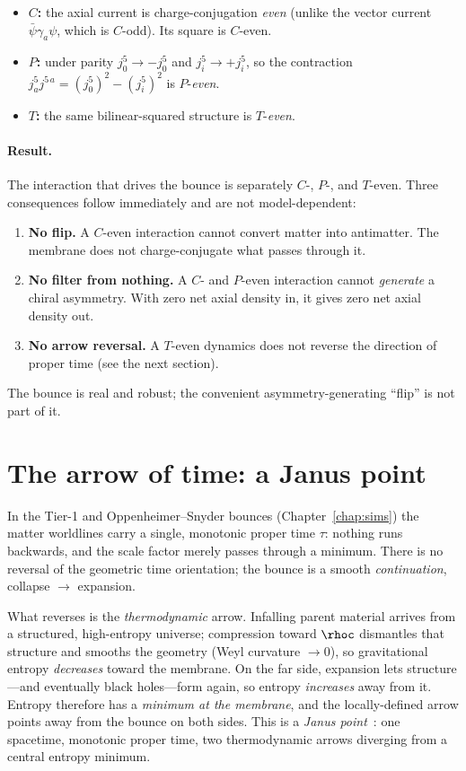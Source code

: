 \begin{itemize}
  \item \textbf{$C$:} the axial current is charge-conjugation \emph{even} (unlike
    the vector current $\bar\psi\gamma_a\psi$, which is $C$-odd). Its square is
    $C$-even.
  \item \textbf{$P$:} under parity $j^5_0 \to -j^5_0$ and $j^5_i \to +j^5_i$, so
    the contraction $j^5_a j^{5\,a} = (j^5_0)^2 - (j^5_i)^2$ is $P$-\emph{even}.
  \item \textbf{$T$:} the same bilinear-squared structure is $T$-\emph{even}.
\end{itemize}

\paragraph{Result.} The interaction that drives the bounce is separately $C$-,
$P$-, and $T$-even. Three consequences follow immediately and are not
model-dependent:

\begin{enumerate}
  \item \textbf{No flip.} A $C$-even interaction cannot convert matter into
    antimatter. The membrane does not charge-conjugate what passes through it.
  \item \textbf{No filter from nothing.} A $C$- and $P$-even interaction cannot
    \emph{generate} a chiral asymmetry. With zero net axial density in, it gives
    zero net axial density out.
  \item \textbf{No arrow reversal.} A $T$-even dynamics does not reverse the
    direction of proper time (see the next section).
\end{enumerate}

The bounce is real and robust; the convenient asymmetry-generating ``flip'' is
not part of it.

\section{The arrow of time: a Janus point}

In the Tier-1 and Oppenheimer--Snyder bounces (Chapter~\ref{chap:sims}) the
matter worldlines carry a single, monotonic proper time $\tau$: nothing runs
backwards, and the scale factor merely passes through a minimum. There is no
reversal of the geometric time orientation; the bounce is a smooth
\emph{continuation}, collapse $\to$ expansion.

What reverses is the \emph{thermodynamic} arrow. Infalling parent material
arrives from a structured, high-entropy universe; compression toward $\rhoc$
dismantles that structure and smooths the geometry (Weyl curvature $\to 0$), so
gravitational entropy \emph{decreases} toward the membrane. On the far side,
expansion lets structure---and eventually black holes---form again, so entropy
\emph{increases} away from it. Entropy therefore has a \emph{minimum at the
membrane}, and the locally-defined arrow points away from the bounce on both
sides. This is a \emph{Janus point}~\citep{barbour2014}: one spacetime, monotonic
proper time, two thermodynamic arrows diverging from a central entropy minimum.

